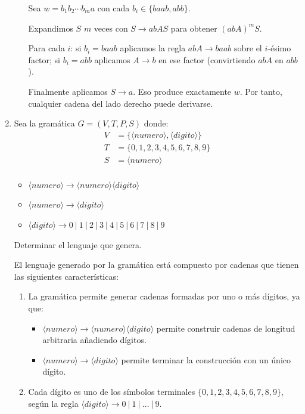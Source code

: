 \documentclass[12pt]{report} %
\begin{document}
\begin{enumerate}
\begin{solucion}[Ejercicio 2.a]
\begin{enumerate}
               Sea $w = b_1b_2\cdots b_ma$ con cada $b_i \in \{baab, abb\}$.

               Expandimos $S$ $m$ veces con $S \to abAS$ para obtener $(abA)^mS$.

               Para cada $i$: si $b_i = baab$ aplicamos la regla $abA \to baab$ sobre el $i$-ésimo factor; si $b_i = abb$ aplicamos $A \to b$ en ese factor (convirtiendo $abA$ en $abb$).

               Finalmente aplicamos $S \to a$. Eso produce exactamente $w$. Por tanto, cualquier cadena del lado derecho puede derivarse.
       \end{enumerate}

   \end{solucion}
\item
  Sea la gramática \(G = (V, T, P, S)\) donde:\\
  \begin{align*}
   V &= \{\langle numero \rangle, \langle digito \rangle\} \\
   T &= \{0, 1, 2, 3, 4, 5, 6, 7, 8, 9\} \\
   S &= \langle numero \rangle \\
   \end{align*}

  \begin{itemize}
       \item $\langle numero \rangle \to \langle numero \rangle \langle digito \rangle$
       \item $\langle numero \rangle \to \langle digito \rangle$
       \item $\langle digito \rangle \to 0 \ | \ 1 \ | \ 2 \ | \ 3 \ | \ 4 \ | \ 5 \ | \ 6 \ | \ 7 \ | \ 8 \ | \ 9$
   \end{itemize}

  Determinar el lenguaje que genera.

  \begin{solucion}[Ejercicio 2.b]

   El lenguaje generado por la gramática está compuesto por cadenas que tienen las siguientes características:

   \begin{enumerate}
       \item La gramática permite generar cadenas formadas por uno o más dígitos, ya que:
           \begin{itemize}
               \item $\langle numero \rangle \to \langle numero \rangle \langle digito \rangle$ permite construir cadenas de longitud arbitraria añadiendo dígitos.
               \item $\langle numero \rangle \to \langle digito \rangle$ permite terminar la construcción con un único dígito.
           \end{itemize}
       \item Cada dígito es uno de los símbolos terminales $\{0, 1, 2, 3, 4, 5, 6, 7, 8, 9\}$, según la regla $\langle digito \rangle \to 0 \ | \ 1 \ | \ \dots \ | \ 9$.
   \end{enumerate}


\end{solucion}
\end{enumerate}
\end{document}
